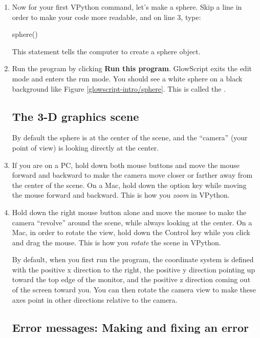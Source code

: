 \begin{enumerate}
	\item Now for your first VPython command, let's make a sphere. Skip a line in order to make your code more readable, and on line 3, type:

\begin{myvpython}
sphere()
\end{myvpython}

This statement tells the computer to create a sphere object.

	\item Run the program by clicking {\bf Run this program}. GlowScript exits the edit mode and enters the run mode. You should see a white sphere on a black background like Figure \ref{glowscript-intro/sphere}. This is called the .



	\subsection*{The 3-D graphics scene}
	
By default the sphere is at the center of the scene, and the ``camera'' (your point of view) is looking directly at the center.
	
	\item If you are on a PC, hold down both mouse buttons and move the mouse forward and backward to make the camera move closer or farther away from the center of the scene. On a Mac, hold down the option key while moving the mouse forward and backward. This is how you \emph{zoom} in VPython.
	
	\item Hold down the right mouse button alone and move the mouse to make the camera ``revolve'' around the scene, while always looking at the center. On a Mac, in order to rotate the view, hold down the Control key while you click and drag the mouse. This is how you \emph{rotate} the scene in VPython.

By default, when you first run the program, the coordinate system is defined with the positive x direction to the right, the positive y direction pointing up toward the top edge of the monitor, and the positive z direction coming out of the screen toward you. You can then rotate the camera view to make these axes point in other directions relative to the camera. 
		
	\subsection*{Error messages: Making and fixing an error}
	

\end{enumerate}
